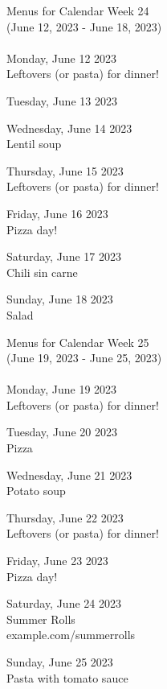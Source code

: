 \documentclass[12pt, parskip=full*]{scrreprt}
\begin{document}
\begin{center}
{\Large Menus for Calendar Week 24} \\ 
{\small (June 12, 2023 - June 18, 2023)}\\ 
 ~ \\{\calligra \Large Monday, June 12 2023} \\ 
Leftovers (or pasta) for dinner!

{\calligra \Large Tuesday, June 13 2023} \\ 
\href{}{}

{\calligra \Large Wednesday, June 14 2023} \\ 
Lentil soup

{\calligra \Large Thursday, June 15 2023} \\ 
Leftovers (or pasta) for dinner!

{\calligra \Large Friday, June 16 2023} \\ 
Pizza day!

{\calligra \Large Saturday, June 17 2023} \\ 
Chili sin carne


{\calligra \Large Sunday, June 18 2023} \\ 
Salad

\newpage
{\Large Menus for Calendar Week 25} \\ 
{\small (June 19, 2023 - June 25, 2023)}\\ 
 ~ \\{\calligra \Large Monday, June 19 2023} \\ 
Leftovers (or pasta) for dinner!

{\calligra \Large Tuesday, June 20 2023} \\ 
Pizza


{\calligra \Large Wednesday, June 21 2023} \\ 
Potato soup

{\calligra \Large Thursday, June 22 2023} \\ 
Leftovers (or pasta) for dinner!

{\calligra \Large Friday, June 23 2023} \\ 
Pizza day!

{\calligra \Large Saturday, June 24 2023} \\ 
Summer Rolls\\
example.com/summerrolls


{\calligra \Large Sunday, June 25 2023} \\ 
Pasta with tomato sauce

\end{center}
\end{document}
